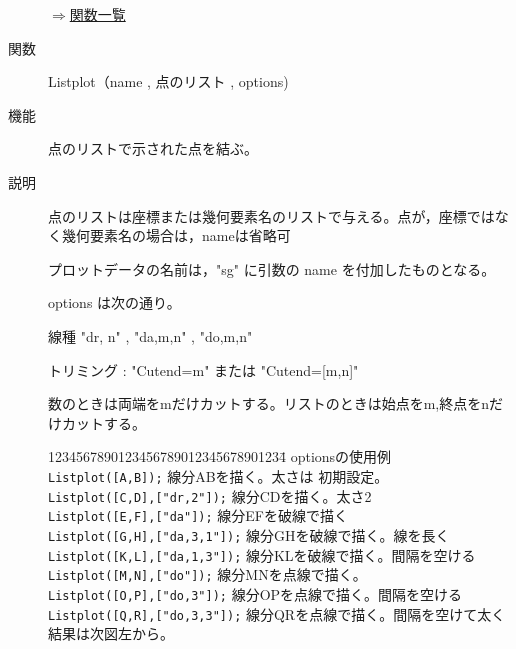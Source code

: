 \documentclass[papersize,a4paper,12pt,uplatex]{jsarticle}
\begin{document}
\begin{description}
\vspace{\baselineskip}
\hspace{20mm} 

\begin{flushright}  \hyperlink{functionlist}{$\Rightarrow$関数一覧}\end{flushright}

\vspace{\baselineskip}
\hypertarget{listplot}{}
\item[関数]  Listplot（name , 点のリスト , options)
\item[機能]  点のリストで示された点を結ぶ。
\item[説明]  点のリストは座標または幾何要素名のリストで与える。点が，座標ではなく幾何要素名の場合は，nameは省略可 

プロットデータの名前は，"sg" に引数の name を付加したものとなる。

 options は次の通り。

線種   "dr, n"  , "da,m,n" , "do,m,n"

トリミング :  "Cutend=m" または "Cutend=[m,n]" 

数のときは両端をmだけカットする。リストのときは始点をm,終点をnだけカットする。

\begin{tabbing}
1234567890123456789012345678901234\=\kill
  optionsの使用例\\
    \verb|Listplot([A,B]);|            \>線分ABを描く。太さは 初期設定。\\
    \verb|Listplot([C,D],["dr,2"]);|     \>線分CDを描く。太さ2\\
    \verb|Listplot([E,F],["da"]);|       \>線分EFを破線で描く\\
    \verb|Listplot([G,H],["da,3,1"]);|   \>線分GHを破線で描く。線を長く\\
    \verb|Listplot([K,L],["da,1,3"]);|    \>線分KLを破線で描く。間隔を空ける\\
    \verb|Listplot([M,N],["do"]);|      \>線分MNを点線で描く。\\
    \verb|Listplot([O,P],["do,3"]);|     \>線分OPを点線で描く。間隔を空ける\\
    \verb|Listplot([Q,R],["do,3,3"]);|   \>線分QRを点線で描く。間隔を空けて太く\\
結果は次図左から。
\end{tabbing}
    \begin{center} \end{center}


\end{description}
\end{document}
